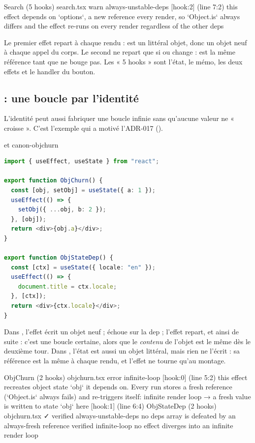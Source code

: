 \begin{sortie}
  Search  (5 hooks)  search.tsx
    warn   always-unstable-deps  [hook:2]  (line 7:2)  this effect depends on `options`, a new reference every render, so `Object.is` always differs and the effect re-runs on every render regardless of the other deps
\end{sortie}

Le premier effet repart à chaque rendu :  est un littéral objet,
donc un objet neuf à chaque appel du corps. Le second ne repart que si
 ou  change :  est la même référence tant
que  ne bouge pas. Les « 5 hooks » sont l'état, le mémo, les deux
effets et le handler du bouton.

\subsection{ : une boucle par l'identité}

L'identité peut aussi fabriquer une boucle infinie sans qu'aucune valeur ne
« croisse ». C'est l'exemple qui a motivé l'ADR-017 ().

\begin{exemple}{ et }{canon-objchurn}
\begin{lstlisting}[language=TypeScript,caption={\code{ObjChurn} et \code{ObjStateDep} (\file{/tmp/ch02/objchurn.tsx})},label={lst:react-modele-objchurn}]
import { useEffect, useState } from "react";

export function ObjChurn() {
  const [obj, setObj] = useState({ a: 1 });
  useEffect(() => {
    setObj({ ...obj, b: 2 });
  }, [obj]);
  return <div>{obj.a}</div>;
}

export function ObjStateDep() {
  const [ctx] = useState({ locale: "en" });
  useEffect(() => {
    document.title = ctx.locale;
  }, [ctx]);
  return <div>{ctx.locale}</div>;
}
\end{lstlisting}
\end{exemple}

Dans , l'effet écrit un objet neuf ;  échoue
sur la dep  ; l'effet repart, et ainsi de suite : c'est une boucle
certaine, alors que le \emph{contenu} de l'objet est le même dès le deuxième
tour. Dans , l'état est aussi un objet littéral, mais rien ne
l'écrit : sa référence est la même à chaque rendu, et l'effet ne tourne qu'au
montage.

\begin{sortie}
  ObjChurn  (2 hooks)  objchurn.tsx
    error  infinite-loop  [hook:0]  (line 5:2)  this effect recreates object state `obj` it depends on. Every run stores a fresh reference (`Object.is` always fails) and re-triggers itself: infinite render loop
       → a fresh value is written to state `obj` here [hook:1] (line 6:4)
  ObjStateDep  (2 hooks)  objchurn.tsx  ✓
    verified  always-unstable-deps  no deps array is defeated by an always-fresh reference
    verified  infinite-loop  no effect diverges into an infinite render loop
\end{sortie}

